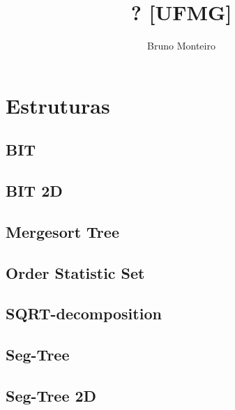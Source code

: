 \documentclass[12pt, a4paper, twoside]{article}
\title{? [UFMG]}
\author{Bruno Monteiro}
\begin{document}
\twocolumn
\date{} %
\maketitle


\renewcommand{\contentsname}{Índice} %
\tableofcontents





%
%

\section{Estruturas}

\subsection{BIT}


\subsection{BIT 2D}


\subsection{Mergesort Tree}


\subsection{Order Statistic Set}


\subsection{SQRT-decomposition}


\subsection{Seg-Tree}


\subsection{Seg-Tree 2D}

\end{document}
